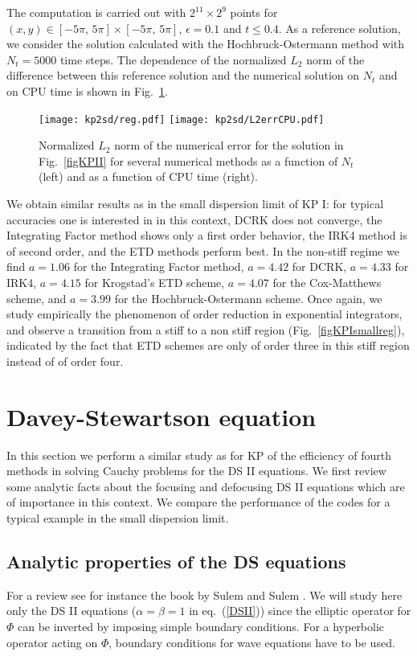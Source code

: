 \documentclass[final]{siamltex}
\begin{document}
The computation is carried out with $2^{11}\times2^{9}$
points for $(x, y)\in[-5\pi,\,5\pi]\times[-5\pi,\,5\pi]$,
$\epsilon=0.1$ and $t\leq0.4$. As a reference solution, we consider
the solution calculated with the Hochbruck-Ostermann method with $N_{t}=5000$
time steps. The dependence of the normalized $L_{2}$ norm of the
difference between this reference solution and the numerical solution
on $N_{t}$ and on CPU time is shown in Fig.~\ref{figKPIIsmallreg}.
\begin{figure}[htb!]
   \centering
\texttt{[image: kp2sd/reg.pdf]}
\texttt{[image: kp2sd/L2errCPU.pdf]}
 \caption{Normalized $L_{2}$ norm of the numerical error for the 
 solution in Fig.~\ref{figKPII} for several numerical
methods as a function of $N_{t}$ (left) and as a function of CPU 
 time (right).}
  \label{figKPIIsmallreg}
\end{figure}
 We obtain  similar results as in the 
small dispersion limit of KP I:
for typical accuracies one is interested in in this context, DCRK 
does not converge, the Integrating Factor method shows only a first 
order behavior, the IRK4 method is of second order, and the ETD methods perform best. In the non-stiff 
regime we find
 $a=1.06$ for the Integrating Factor method, $a=4.42$ for
 DCRK, $a=4.33$ for IRK4, 
$a=4.15$ for Krogstad's ETD scheme, $a=4.07$ for the Cox-Matthews scheme, and $a=3.99$ 
for the Hochbruck-Ostermann scheme.  
Once again, we study empirically the phenomenon of order reduction
in exponential integrators, and observe a transition from a stiff to a non 
stiff region (Fig.~\ref{figKPIsmallreg}), 
indicated by the fact that ETD schemes are only of order three in this stiff region instead of of order four.

\section{Davey-Stewartson equation}
In this section we perform a similar study as for KP of the efficiency of 
fourth methods in solving  Cauchy problems for the DS II equations. We first 
review some analytic facts about the focusing and defocusing DS II 
equations which are of importance 
in this context. 
We compare the performance of the codes for a 
typical example in the small dispersion limit.

\subsection{Analytic properties of the DS equations}
For a review see for instance the book by Sulem and 
Sulem \cite{SS}. 
We will study here only the DS II equations ($\alpha=\beta=1$ in 
eq.~(\ref{DSII})) since the 
elliptic operator for $\Phi$ can be inverted by imposing simple boundary 
conditions. For a hyperbolic operator acting on $\Phi$, boundary 
conditions for wave equations have to be used.
\end{document}
